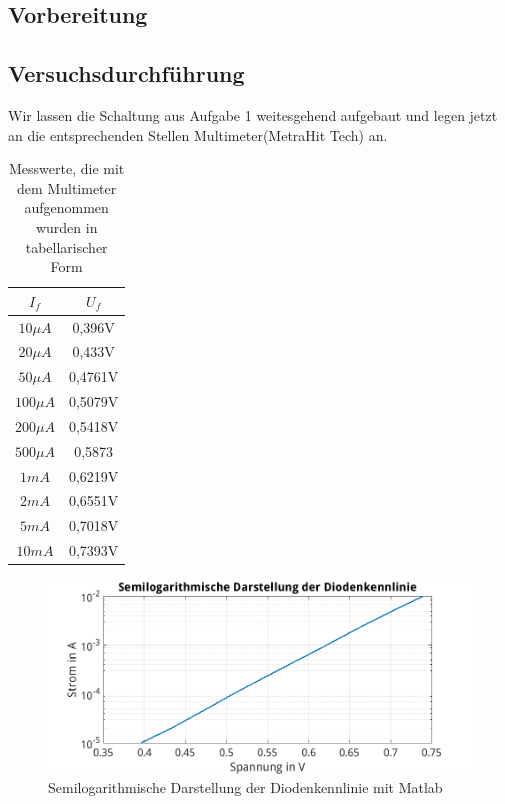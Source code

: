 \documentclass{article}
\begin{document}
\subsection{Vorbereitung}

\subsection{Versuchsdurchführung}

Wir lassen die Schaltung aus Aufgabe 1 weitesgehend aufgebaut und legen jetzt an die entsprechenden Stellen Multimeter(MetraHit Tech) an.

\begin{table}[h]
  \begin{center}
\begin{tabular}{|c|c|}
  \hline
  $I_{f}$ & $U_{f}$  \\
  \hline
  $10\mu A$ & 0,396V\\
  \hline
  $20\mu A$ & 0,433V\\
  \hline
  $50\mu A$ & 0,4761V\\
  \hline
  $100\mu A$ & 0,5079V\\
  \hline
  $200\mu A$ & 0,5418V\\
  \hline
  $500\mu A$ & 0,5873\\
  \hline
  $1mA$ & 0,6219V\\
  \hline
  $2mA$ & 0,6551V\\
  \hline
  $5mA$ & 0,7018V\\
  \hline
  $10mA$ & 0,7393V\\
  \hline
\end{tabular}
\caption{Messwerte, die mit dem Multimeter aufgenommen wurden in tabellarischer Form}
\end{center}
\end{table}

\begin{figure}[h]
  \begin{center}
    \includegraphics[scale=0.6]{../assets/images/EL1P2/SemilogDiode2.png}
    \caption{Semilogarithmische Darstellung der Diodenkennlinie mit Matlab}
  \end{center}
\end{figure}
\end{document}
